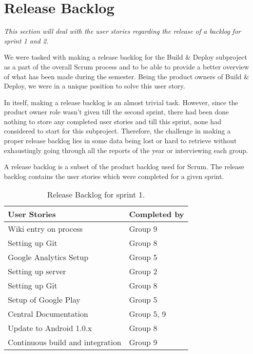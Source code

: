 \section{Release Backlog} \label{Sprint3_SecReleaseBacklog}
\textit{This section will deal with the user stories regarding the release of a backlog for sprint 1 and 2.}

We were tasked with making a release backlog for the Build \& Deploy subproject as a part of the overall Scrum process and to be able to provide a better overview of what has been made during the semester. Being the product owners of Build \& Deploy, we were in a unique position to solve this user story.

In itself, making a release backlog is an almost trivial task. However, since the product owner role wasn't given till the second sprint, there had been done nothing to store any completed user stories and till this sprint, none had considered to start for this subproject.
Therefore, the challenge in making a proper release backlog lies in some data being lost or hard to retrieve without exhaustingly going through all the reports of the year or interviewing each group.

A release backlog is a subset of the product backlog used for Scrum. The release backlog contains the user stories which were completed for a given sprint.

\begin{table}
	\centering
	\begin{tabular}{ll}
		\textbf{User Stories} & \textbf{Completed by}\\ \hline \noalign{\vskip 2mm}
		Wiki entry on process & Group 9\\ \hline
		Setting up Git & Group 8\\ \hline
		Google Analytics Setup & Group 5\\ \hline
		Setting up server & Group 2\\ \hline
		Setting up Git & Group 8\\ \hline
		Setup of Google Play & Group 5\\ \hline
		Central Documentation & Group 5, 9\\ \hline
		Update to Android 1.0.x & Group 8\\ \hline
		Continuous build and integration & Group 9\\ \hline
	\end{tabular}
	\caption{Release Backlog for sprint 1.}
	\label{Sprint3_ReleaseBacklogSprint1_table}
\end{table}

